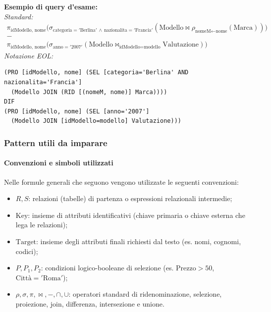 \documentclass[12pt]{extarticle}
\begin{document}
\noindent \textbf{Esempio di query d'esame:}\\
\textit{Standard:}
\[
\begin{gathered}
\pi_{\text{idModello, nome}} \big( \sigma_{\text{categoria} = '\text{Berlina}' \,\land\, \text{nazionalita} = '\text{Francia}'}(\text{Modello} \bowtie \rho_{\text{nomeM} \leftarrow \text{nome}}(\text{Marca})) \big) \\
- \\
\pi_{\text{idModello, nome}} \big( \sigma_{\text{anno} = '2007'}(\text{Modello} \bowtie_{\text{idModello} = \text{modello}} \text{Valutazione}) \big)
\end{gathered}
\]
\textit{Notazione EOL:}
\begin{verbatim}
(PRO [idModello, nome] (SEL [categoria='Berlina' AND nazionalita='Francia'] 
  (Modello JOIN (RID [(nomeM, nome)] Marca)))) 
DIF 
(PRO [idModello, nome] (SEL [anno='2007'] 
  (Modello JOIN [idModello=modello] Valutazione)))
\end{verbatim}


\subsubsection{Pattern utili da imparare}

\paragraph{Convenzioni e simboli utilizzati}
Nelle formule generali che seguono vengono utilizzate le seguenti convenzioni:
\begin{itemize}
    \item $R, S$: relazioni (tabelle) di partenza o espressioni relazionali intermedie;
    \item $\text{Key}$: insieme di attributi identificativi (chiave primaria o chiave esterna che lega le relazioni);
    \item $\text{Target}$: insieme degli attributi finali richiesti dal testo (es. nomi, cognomi, codici);
    \item $P, P_1, P_2$: condizioni logico-booleane di selezione (es. $\text{Prezzo} > 50$, $\text{Città} = '\text{Roma}'$);
    \item $\rho, \sigma, \pi, \bowtie, -, \cap, \cup$: operatori standard di ridenominazione, selezione, proiezione, join, differenza, intersezione e unione.
\end{itemize}

\end{document}
